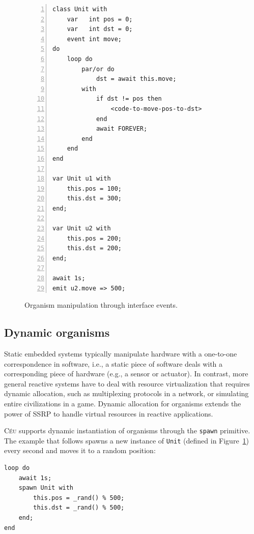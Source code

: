 \documentclass{sigplanconf}
\newcommand{\CEU}{\textsc{C\'{e}u}\xspace}
\newcommand{\code}[1] {{\small{\texttt{#1}}}}
\newcommand{\1}{\;}
\newcommand{\2}{\;\;}
\newcommand{\3}{\;\;\;}
\newcommand{\5}{\;\;\;\;\;}
\begin{document}
\begin{figure}[t]
\begin{lstlisting}[numbers=left,xleftmargin=3em]
class Unit with
    var   int pos = 0;
    var   int dst = 0;
    event int move;
do
    loop do
        par/or do
            dst = await this.move;
        with
            if dst != pos then
                <code-to-move-pos-to-dst>
            end
            await FOREVER;
        end
    end
end

var Unit u1 with
    this.pos = 100;
    this.dst = 300;
end;

var Unit u2 with
    this.pos = 200;
    this.dst = 200;
end;

await 1s;
emit u2.move => 500;
\end{lstlisting}
\caption{ Organism manipulation through interface events.
\label{lst.unit}
}
\end{figure}

\subsection{Dynamic organisms}

Static embedded systems typically manipulate hardware with a one-to-one 
correspondence in software, i.e., a static piece of software deals with a 
corresponding piece of hardware (e.g., a sensor or actuator).
%
In contrast, more general reactive systems have to deal with resource 
virtualization that requires dynamic allocation, such as multiplexing protocols 
in a network, or simulating entire civilizations in a game.
%
Dynamic allocation for organisms extends the power of SSRP to handle virtual 
resources in reactive applications.

\CEU supports dynamic instantiation of organisms through the \code{spawn} 
primitive.
The example that follows spawns a new instance of \code{Unit} (defined in 
Figure~\ref{lst.unit}) every second and moves it to a random position:

\begin{lstlisting}
loop do
    await 1s;
    spawn Unit with
        this.pos = _rand() % 500;
        this.dst = _rand() % 500;
    end;
end
\end{lstlisting}

\end{document}
